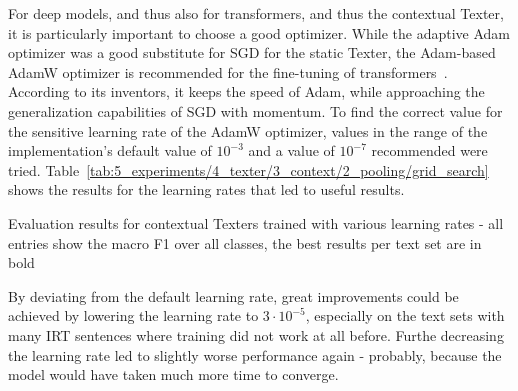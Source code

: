 For deep models, and thus also for transformers, and thus the contextual Texter, it is particularly important to choose a good optimizer. While the adaptive Adam optimizer was a good substitute for SGD for the static Texter, the Adam-based AdamW optimizer is recommended for the fine-tuning of transformers~\cite{Loshchilov2019DecoupledWD}. According to its inventors, it keeps the speed of Adam, while approaching the generalization capabilities of SGD with momentum. To find the correct value for the sensitive learning rate of the AdamW optimizer, values in the range of the implementation's default value of $10^{-3}$ and a value of $10^{-7}$ recommended were tried. Table~\ref{tab:5_experiments/4_texter/3_context/2_pooling/grid_search} shows the results for the learning rates that led to useful results.

\begin{table}[h]
    \centering
    
    \caption{Evaluation results for contextual Texters trained with various learning rates - all entries show the macro F1 over all classes, the best results per text set are in bold}
    \label{tab:5_experiments/4_texter/3_context/3_optimizer/grid_search}
\end{table}

By deviating from the default learning rate, great improvements could be achieved by lowering the learning rate to $3 \cdot 10^{-5}$, especially on the text sets with many IRT sentences where training did not work at all before. Furthe decreasing the learning rate led to slightly worse performance again - probably, because the model would have taken much more time to converge.
